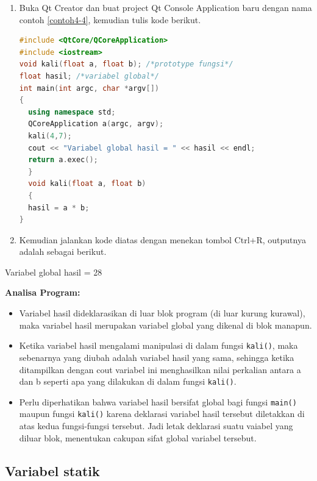 \begin{enumerate}

\item
  Buka Qt Creator dan buat project Qt Console Application baru dengan
  nama contoh \ref{contoh4-4}, kemudian tulis kode berikut.

\begin{lstlisting}[language=c++, caption=Variabel Global, label=contoh4-4]
#include <QtCore/QCoreApplication>
#include <iostream>
void kali(float a, float b); /*prototype fungsi*/
float hasil; /*variabel global*/
int main(int argc, char *argv[])
{
  using namespace std;
  QCoreApplication a(argc, argv);
  kali(4,7);
  cout << "Variabel global hasil = " << hasil << endl;
  return a.exec();
  }
  void kali(float a, float b)
  {
  hasil = a * b;
}
\end{lstlisting}
\item
  Kemudian jalankan kode diatas dengan menekan tombol Ctrl+R, outputnya
  adalah sebagai berikut.
\end{enumerate}
\begin{lcverbatim}
Variabel global hasil = 28
\end{lcverbatim}


\textbf{Analisa Program:}

\begin{itemize}

\item
  Variabel hasil dideklarasikan di luar blok program (di luar kurung
  kurawal), maka variabel hasil merupakan variabel global yang dikenal
  di blok manapun.
\item
  Ketika variabel hasil mengalami manipulasi di dalam fungsi
  \texttt{kali()}, maka sebenarnya yang diubah adalah variabel hasil
  yang sama, sehingga ketika ditampilkan dengan cout variabel ini
  menghasilkan nilai perkalian antara a dan b seperti apa yang dilakukan
  di dalam fungsi \texttt{kali()}.
\item
  Perlu diperhatikan bahwa variabel hasil bersifat global bagi fungsi
  \texttt{main()} maupun fungsi \texttt{kali()} karena deklarasi
  variabel hasil tersebut diletakkan di atas kedua fungsi-fungsi
  tersebut. Jadi letak deklarasi suatu vaiabel yang diluar blok,
  menentukan cakupan sifat global variabel tersebut.
\end{itemize}

\subsection{ Variabel statik}\label{variabel-statik}


